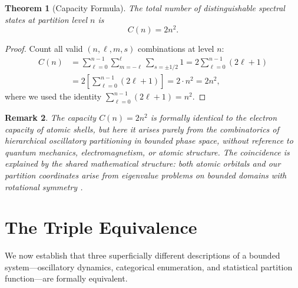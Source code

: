 \documentclass[11pt,twocolumn,a4paper]{article}
\newtheorem{theorem}{Theorem}[section]
\newtheorem{remark}[theorem]{Remark}
\begin{document}
\begin{theorem}[Capacity Formula]
\label{thm:capacity}
The total number of distinguishable spectral states at partition level
$n$ is
\begin{equation}
\label{eq:capacity}
  C(n) = 2n^2.
\end{equation}
\end{theorem}

\begin{proof}
Count all valid $(n, \ell, m, s)$ combinations at level $n$:
\begin{align}
  C(n) &= \sum_{\ell=0}^{n-1} \sum_{m=-\ell}^{\ell} \sum_{s=\pm 1/2} 1
  = 2 \sum_{\ell=0}^{n-1} (2\ell + 1) \nonumber \\
  &= 2 \left[ \sum_{\ell=0}^{n-1} (2\ell + 1) \right]
  = 2 \cdot n^2 = 2n^2,
\end{align}
where we used the identity $\sum_{\ell=0}^{n-1}(2\ell+1) = n^2$.
\end{proof}

\begin{remark}
The capacity $C(n) = 2n^2$ is formally identical to the electron
capacity of atomic shells, but here it arises purely from the
combinatorics of hierarchical oscillatory partitioning in bounded
phase space, without reference to quantum mechanics, electromagnetism,
or atomic structure. The coincidence is explained by the shared
mathematical structure: both atomic orbitals and our partition
coordinates arise from eigenvalue problems on bounded domains with
rotational symmetry \citep{sakurai2017, courant1953}.
\end{remark}


\section{The Triple Equivalence}
\label{sec:triple_equivalence}

We now establish that three superficially different descriptions of a
bounded system---oscillatory dynamics, categorical enumeration, and
statistical partition function---are formally equivalent.
\end{document}
